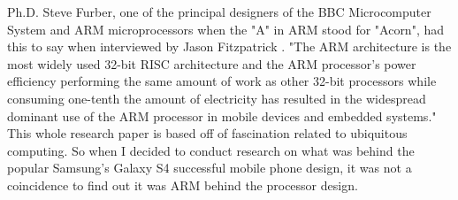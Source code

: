 \documentclass[12pt]{scrreprt}
\begin{document}
	Ph.D. Steve Furber, one of the principal designers of the BBC Microcomputer System and ARM microprocessors when the "A" in ARM stood for "Acorn", had this to say when interviewed by Jason Fitzpatrick \autocite[1]{steveFurber}. "The ARM architecture is the most widely used 32-bit RISC architecture and the ARM processor's power efficiency performing the same amount of work as other 32-bit processors while consuming one-tenth the amount of electricity has resulted in the widespread dominant use of the ARM processor in mobile devices and embedded systems." This whole research paper is based off of fascination related to ubiquitous computing. So when I decided to conduct research on what was behind the popular Samsung's Galaxy S4 successful mobile phone design, it was not a coincidence to find out it was ARM behind the processor design.

\printbibliography
\end{document}
